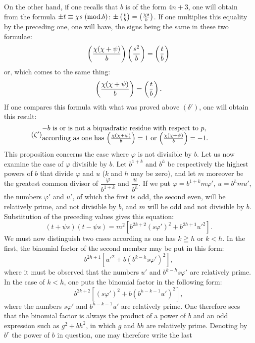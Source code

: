 \noindent
On the other hand, if one recalls that $b$ is of the form $4n+3$, one will obtain
from the formula $\pm t\equiv\chi s\;(\mathrm{mod}.b)$: $\pm\left(\frac{t}{b}\right)=\left(\frac{\chi s}{b}\right)$. If one multiplies this equality
by the preceding one, one will have, the signs being the same in these two
formulae:
\[
\left(\frac{\chi(\chi+\psi)}{b}\right)\left(\frac{s^2}{b}\right)=\left(\frac{t}{b}\right)
\]
or, which comes to the same thing:
\[
\left(\frac{\chi(\chi+\psi)}{b}\right)=\left(\frac{t}{b}\right).
\]
If one compares this formula with what was proved above $(\delta')$, one will obtain
this result:
\begin{equation*}\tag{$\zeta'$}
\begin{minipage}{0.83\textwidth}
$-b$ is or is not a biquadratic residue with respect to $p$,\par
according as one has $\leg{\chi(\chi+\psi)}{b}=1$ or $\leg{\chi(\chi+\psi)}{b}=-1$.
\end{minipage}
\end{equation*}
This proposition concerns the case where $\varphi$ is not divisible by $b$. Let us
now examine the case of $\varphi$ divisible by $b$. Let $b^{1+k}$ and $b^h$ be respectively
the highest powers of $b$ that divide $\varphi$ and $u$ ($k$ and $h$ may be
zero), and let $m$ moreover be the greatest common divisor of $\dfrac{\varphi}{b^{1+k}}$ and $\dfrac{u}{b^h}$. If we
put $\varphi=b^{1+k}m\varphi'$, $u=b^hmu'$, the numbers $\varphi'$ and $u'$, of which the first is
odd, the second even, will be relatively prime, and not divisible by $b$, and $m$
will be odd and not divisible by $b$. Substitution of the preceding values
gives this equation:
\[
(t+\psi s)(t-\psi s)=m^2[b^{2k+2}(s\varphi')^2+b^{2h+1}u'^2].
\]
We must now distinguish two cases according as one has $k\geqq h$ or $k<h$.
In the first, the binomial factor of the second member may be put in this
form:
\[
b^{2h+1}[u'^2+b(b^{k-h}s\varphi')^2],
\]
where it must be observed that the numbers $u'$ and $b^{k-h}s\varphi'$ are relatively prime.
In the case of $k<h$, one puts the binomial factor in the following form:
\[
b^{2k+2}[(s\varphi')^2+b(b^{h-k-1}u')^2],
\]
where the numbers $s\varphi'$ and $b^{h-k-1}u'$ are relatively prime. One therefore sees that the
binomial factor is always the product of a power of $b$ and an odd expression
such as $g^2+bh^2$, in which $g$ and $bh$ are relatively prime. Denoting
by $b^r$ the power of $b$ in question, one may therefore write the last
